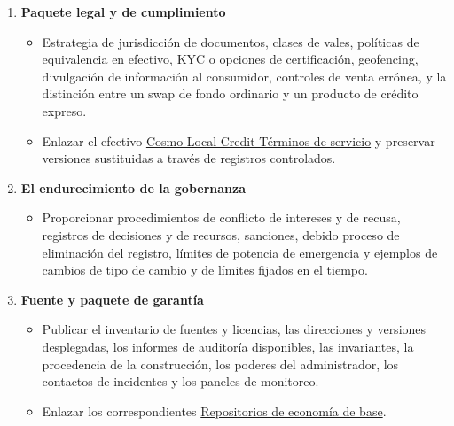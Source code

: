\documentclass[11pt]{article}
\begin{document}
\begin{enumerate}[leftmargin=*]
\begin{itemize}[leftmargin=*]
\end{itemize}
\item \textbf{Paquete legal y de cumplimiento}
\begin{itemize}[leftmargin=*]
\item Estrategia de jurisdicción de documentos, clases de vales, políticas de equivalencia en efectivo, KYC o opciones de certificación, geofencing, divulgación de información al consumidor, controles de venta errónea, y la distinción entre un swap de fondo ordinario y un producto de crédito expreso.
\item Enlazar el efectivo \href{https://docs.cosmolocal.credit/es/governance/terms}{Cosmo-Local Credit Términos de servicio} y preservar versiones sustituidas a través de registros controlados.
\end{itemize}
\item \textbf{El endurecimiento de la gobernanza}
\begin{itemize}[leftmargin=*]
\item Proporcionar procedimientos de conflicto de intereses y de recusa, registros de decisiones y de recursos, sanciones, debido proceso de eliminación del registro, límites de potencia de emergencia y ejemplos de cambios de tipo de cambio y de límites fijados en el tiempo.
\end{itemize}
\item \textbf{Fuente y paquete de garantía}
\begin{itemize}[leftmargin=*]
\item Publicar el inventario de fuentes y licencias, las direcciones y versiones desplegadas, los informes de auditoría disponibles, las invariantes, la procedencia de la construcción, los poderes del administrador, los contactos de incidentes y los paneles de monitoreo.
\item Enlazar los correspondientes \href{https://github.com/grassrootseconomics}{Repositorios de economía de base}.
\end{itemize}
\end{enumerate}
\end{document}
